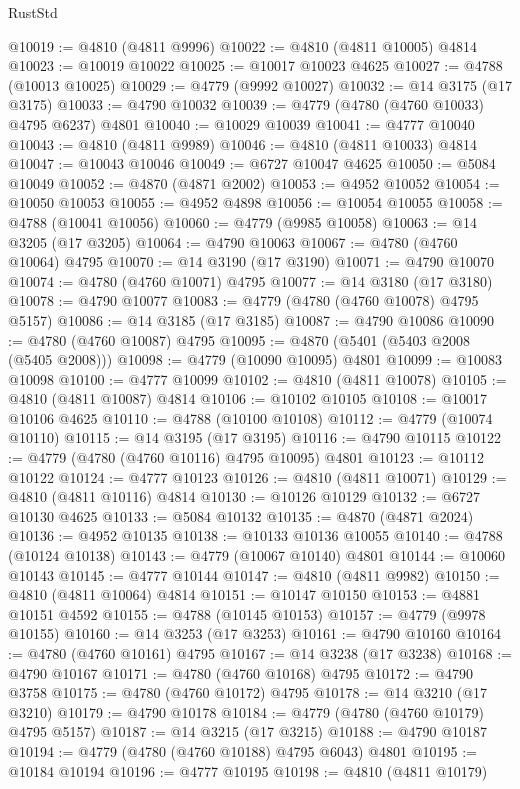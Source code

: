 \begin{lexlean}{RustStd}
\begin{coremodule}
@10019 := @4810 (@4811 @9996)
@10022 := @4810 (@4811 @10005) @4814
@10023 := @10019 @10022
@10025 := @10017 @10023 @4625
@10027 := @4788 (@10013 @10025)
@10029 := @4779 (@9992 @10027)
@10032 := @14 @3175 (@17 @3175)
@10033 := @4790 @10032
@10039 := @4779 (@4780 (@4760 @10033) @4795 @6237) @4801
@10040 := @10029 @10039
@10041 := @4777 @10040
@10043 := @4810 (@4811 @9989)
@10046 := @4810 (@4811 @10033) @4814
@10047 := @10043 @10046
@10049 := @6727 @10047 @4625
@10050 := @5084 @10049
@10052 := @4870 (@4871 @2002)
@10053 := @4952 @10052
@10054 := @10050 @10053
@10055 := @4952 @4898
@10056 := @10054 @10055
@10058 := @4788 (@10041 @10056)
@10060 := @4779 (@9985 @10058)
@10063 := @14 @3205 (@17 @3205)
@10064 := @4790 @10063
@10067 := @4780 (@4760 @10064) @4795
@10070 := @14 @3190 (@17 @3190)
@10071 := @4790 @10070
@10074 := @4780 (@4760 @10071) @4795
@10077 := @14 @3180 (@17 @3180)
@10078 := @4790 @10077
@10083 := @4779 (@4780 (@4760 @10078) @4795 @5157)
@10086 := @14 @3185 (@17 @3185)
@10087 := @4790 @10086
@10090 := @4780 (@4760 @10087) @4795
@10095 := @4870 (@5401 (@5403 @2008 (@5405 @2008)))
@10098 := @4779 (@10090 @10095) @4801
@10099 := @10083 @10098
@10100 := @4777 @10099
@10102 := @4810 (@4811 @10078)
@10105 := @4810 (@4811 @10087) @4814
@10106 := @10102 @10105
@10108 := @10017 @10106 @4625
@10110 := @4788 (@10100 @10108)
@10112 := @4779 (@10074 @10110)
@10115 := @14 @3195 (@17 @3195)
@10116 := @4790 @10115
@10122 := @4779 (@4780 (@4760 @10116) @4795 @10095) @4801
@10123 := @10112 @10122
@10124 := @4777 @10123
@10126 := @4810 (@4811 @10071)
@10129 := @4810 (@4811 @10116) @4814
@10130 := @10126 @10129
@10132 := @6727 @10130 @4625
@10133 := @5084 @10132
@10135 := @4870 (@4871 @2024)
@10136 := @4952 @10135
@10138 := @10133 @10136 @10055
@10140 := @4788 (@10124 @10138)
@10143 := @4779 (@10067 @10140) @4801
@10144 := @10060 @10143
@10145 := @4777 @10144
@10147 := @4810 (@4811 @9982)
@10150 := @4810 (@4811 @10064) @4814
@10151 := @10147 @10150
@10153 := @4881 @10151 @4592
@10155 := @4788 (@10145 @10153)
@10157 := @4779 (@9978 @10155)
@10160 := @14 @3253 (@17 @3253)
@10161 := @4790 @10160
@10164 := @4780 (@4760 @10161) @4795
@10167 := @14 @3238 (@17 @3238)
@10168 := @4790 @10167
@10171 := @4780 (@4760 @10168) @4795
@10172 := @4790 @3758
@10175 := @4780 (@4760 @10172) @4795
@10178 := @14 @3210 (@17 @3210)
@10179 := @4790 @10178
@10184 := @4779 (@4780 (@4760 @10179) @4795 @5157)
@10187 := @14 @3215 (@17 @3215)
@10188 := @4790 @10187
@10194 := @4779 (@4780 (@4760 @10188) @4795 @6043) @4801
@10195 := @10184 @10194
@10196 := @4777 @10195
@10198 := @4810 (@4811 @10179)

\end{coremodule}
\end{lexlean}
